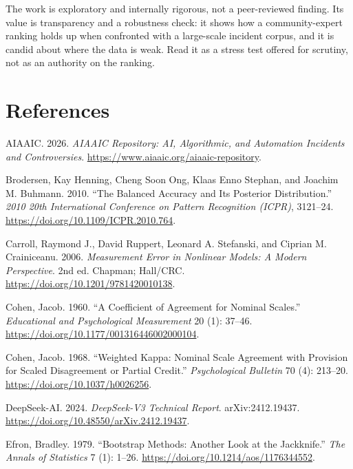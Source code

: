 \documentclass[11pt]{article}
\newlength{\cslhangindent}
\newenvironment{CSLReferences}[2] %
 {\begin{list}{}{%
  \setlength{\itemindent}{0pt}
  \setlength{\leftmargin}{0pt}
  \setlength{\parsep}{0pt}
  \ifodd #1
   \setlength{\leftmargin}{\cslhangindent}
   \setlength{\itemindent}{-1\cslhangindent}
  \fi
  \setlength{\itemsep}{#2\baselineskip}}}
 {\end{list}}
\begin{document}
The work is exploratory and internally rigorous, not a peer-reviewed
finding. Its value is transparency and a robustness check: it shows how
a community-expert ranking holds up when confronted with a large-scale
incident corpus, and it is candid about where the data is weak. Read it
as a stress test offered for scrutiny, not as an authority on the
ranking.

\section*{References}\label{bibliography}

\protect{}\label{refs}
\begin{CSLReferences}{1}{1}
AIAAIC. 2026. \emph{{AIAAIC} Repository: {AI}, Algorithmic, and
Automation Incidents and Controversies}.
\url{https://www.aiaaic.org/aiaaic-repository}.

Brodersen, Kay Henning, Cheng Soon Ong, Klaas Enno Stephan, and Joachim
M. Buhmann. 2010. {``The Balanced Accuracy and Its Posterior
Distribution.''} \emph{2010 20th International Conference on Pattern
Recognition ({ICPR})}, 3121--24.
\url{https://doi.org/10.1109/ICPR.2010.764}.

Carroll, Raymond J., David Ruppert, Leonard A. Stefanski, and Ciprian M.
Crainiceanu. 2006. \emph{Measurement Error in Nonlinear Models: A Modern
Perspective}. 2nd ed. Chapman; Hall/CRC.
\url{https://doi.org/10.1201/9781420010138}.

Cohen, Jacob. 1960. {``A Coefficient of Agreement for Nominal Scales.''}
\emph{Educational and Psychological Measurement} 20 (1): 37--46.
\url{https://doi.org/10.1177/001316446002000104}.

Cohen, Jacob. 1968. {``Weighted Kappa: Nominal Scale Agreement with
Provision for Scaled Disagreement or Partial Credit.''}
\emph{Psychological Bulletin} 70 (4): 213--20.
\url{https://doi.org/10.1037/h0026256}.

DeepSeek-AI. 2024. \emph{{DeepSeek-V3} Technical Report}.
arXiv:2412.19437. \url{https://doi.org/10.48550/arXiv.2412.19437}.

Efron, Bradley. 1979. {``Bootstrap Methods: Another Look at the
Jackknife.''} \emph{The Annals of Statistics} 7 (1): 1--26.
\url{https://doi.org/10.1214/aos/1176344552}.


\end{CSLReferences}
\end{document}
